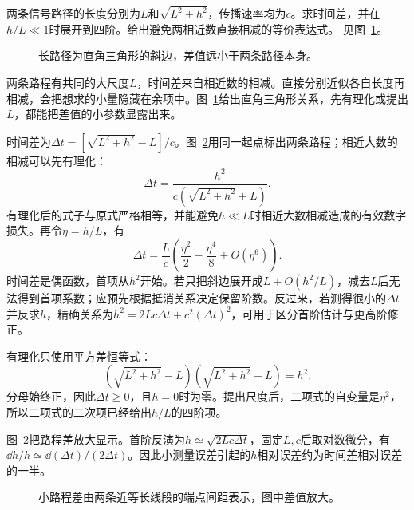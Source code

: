 \begin{exercise}[路程差中的小量抵消]\label{ex:c1-h14}
两条信号路径的长度分别为$L$和$\sqrt{L^2+h^2}$，传播速率均为$c$。求时间差，并在$h/L\ll1$时展开到四阶。给出避免两相近数直接相减的等价表达式。 见图~\ref{fig:c1-h14-q}。
\end{exercise}

\begin{figure}[H]\centering
{}
\caption{长路径为直角三角形的斜边，差值远小于两条路径本身。}\label{fig:c1-h14-q}
\end{figure}
\begin{solution}
两条路程有共同的大尺度$L$，时间差来自相近数的相减。直接分别近似各自长度再相减，会把想求的小量隐藏在余项中。图~\ref{fig:c1-h14-q}给出直角三角形关系，先有理化或提出$L$，都能把差值的小参数显露出来。


时间差为$\Delta t=[\sqrt{L^2+h^2}-L]/c$。图~\ref{fig:c1-h14-s}用同一起点标出两条路程；相近大数的相减可以先有理化：
\[\boxed{\Delta t=\frac{h^2}{c(\sqrt{L^2+h^2}+L)}}.
\]
有理化后的式子与原式严格相等，并能避免$h\ll L$时相近大数相减造成的有效数字损失。再令$\eta=h/L$，有
\[\boxed{\Delta t=\frac Lc\left(\frac{\eta^2}{2}-\frac{\eta^4}{8}+O(\eta^6)\right)}.
\]
时间差是偶函数，首项从$h^2$开始。若只把斜边展开成$L+O(h^2/L)$，减去$L$后无法得到首项系数；应预先根据抵消关系决定保留阶数。反过来，若测得很小的$\Delta t$并反求$h$，精确关系为$h^2=2Lc\Delta t+c^2(\Delta t)^2$，可用于区分首阶估计与更高阶修正。


有理化只使用平方差恒等式：
\[(\sqrt{L^2+h^2}-L)(\sqrt{L^2+h^2}+L)=h^2.\]
分母始终正，因此$\Delta t\ge0$，且$h=0$时为零。提出尺度后，二项式的自变量是$\eta^2$，所以二项式的二次项已经给出$h/L$的四阶项。

图~\ref{fig:c1-h14-s}把路程差放大显示。首阶反演为$h\simeq\sqrt{2Lc\Delta t}$，固定$L,c$后取对数微分，有$\dd h/h\simeq\dd(\Delta t)/(2\Delta t)$。因此小测量误差引起的$h$相对误差约为时间差相对误差的一半。

\begin{figure}[H]\centering
{}
\caption{小路程差由两条近等长线段的端点间距表示，图中差值放大。}\label{fig:c1-h14-s}
\end{figure}
\end{solution}

